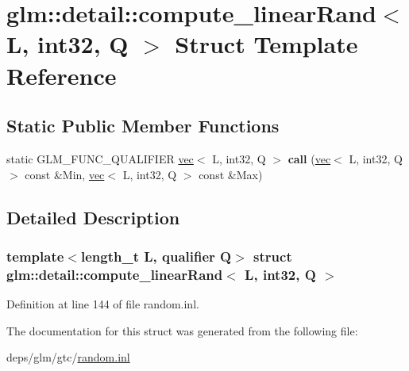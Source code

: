 \hypertarget{structglm_1_1detail_1_1compute__linearRand_3_01L_00_01int32_00_01Q_01_4}{}\section{glm\+:\+:detail\+:\+:compute\+\_\+linear\+Rand$<$ L, int32, Q $>$ Struct Template Reference}
\label{structglm_1_1detail_1_1compute__linearRand_3_01L_00_01int32_00_01Q_01_4}
\subsection*{Static Public Member Functions}
\begin{DoxyCompactItemize}
\item 
\mbox{\label{structglm_1_1detail_1_1compute__linearRand_3_01L_00_01int32_00_01Q_01_4_a6189fc7b1f62fe6c2c046bb5374ffa2a}} 
static G\+L\+M\+\_\+\+F\+U\+N\+C\+\_\+\+Q\+U\+A\+L\+I\+F\+I\+ER \hyperlink{structglm_1_1vec}{vec}$<$ L, int32, Q $>$ {\bfseries call} (\hyperlink{structglm_1_1vec}{vec}$<$ L, int32, Q $>$ const \&Min, \hyperlink{structglm_1_1vec}{vec}$<$ L, int32, Q $>$ const \&Max)
\end{DoxyCompactItemize}


\subsection{Detailed Description}
\subsubsection*{template$<$length\+\_\+t L, qualifier Q$>$\newline
struct glm\+::detail\+::compute\+\_\+linear\+Rand$<$ L, int32, Q $>$}



Definition at line 144 of file random.\+inl.



The documentation for this struct was generated from the following file\+:\begin{DoxyCompactItemize}
\item 
deps/glm/gtc/\hyperlink{random_8inl}{random.\+inl}\end{DoxyCompactItemize}
